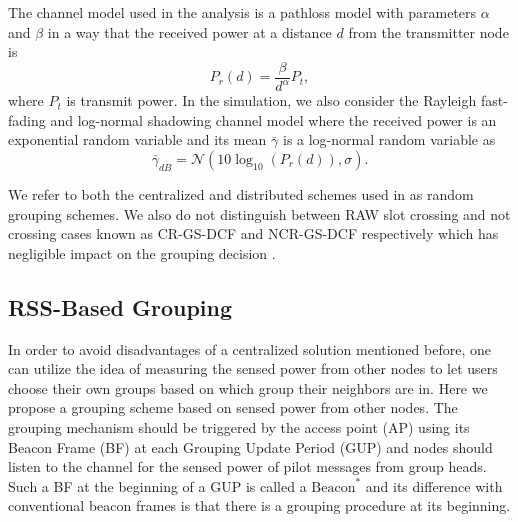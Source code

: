 The channel model used in the analysis is a pathloss model with parameters $\alpha$ and $\beta$ in a way that the received power at a distance $d$ from the transmitter node is
\begin{equation}
P_r(d)=\frac{\beta}{d^\alpha} P_t,
\end{equation}
where $P_t$ is transmit power. In the simulation, we also consider the Rayleigh fast-fading and log-normal shadowing channel model where the received power is an exponential random variable and its mean $\bar{\gamma}$ is a log-normal random variable as 
\begin{equation}
\bar{\gamma}_{dB}= \mathcal{N}(10\log_{10}(P_r(d)),\sigma).
\end{equation}

We refer to both the centralized and distributed schemes used in \cite{zheng2014performance} as random grouping schemes. We also do not distinguish between RAW slot crossing and not crossing cases known as CR-GS-DCF and NCR-GS-DCF respectively which has negligible impact on the grouping decision \cite{Draft80211ah}. 

\subsection{RSS-Based Grouping}
\label{rssbasedmain}
In order to avoid disadvantages of a centralized solution mentioned before, one can utilize the idea of measuring the sensed power from other nodes to let users choose their own groups based on which group their neighbors are in. Here we propose a grouping scheme based on sensed power from other nodes. %
The grouping mechanism should be triggered by the access point (AP) using its Beacon Frame (BF) at each Grouping Update Period (GUP) and nodes should listen to the channel for the sensed power of pilot messages from group heads. Such a BF at the beginning of a GUP is called a $\text{Beacon}^\ast$ and its difference with conventional beacon frames is that there is a grouping procedure at its beginning. 




